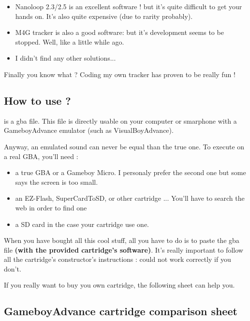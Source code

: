\begin{itemize}
    \item{Nanoloop 2.3/2.5 is an excellent software ! but it's quite difficult to get your hands on. It's also quite expensive (due to rarity probably).}
    \item{M4G tracker is also a good software: but it's development seems to be stopped. Well, like \FAT a little while ago.}
    \item{I didn't find any other solutions...}
\end{itemize}\medskip

Finally you know what ? Coding my own tracker has proven to be really fun !
\medskip

\subsection{How to use \FAT ?}

\FAT is a gba file. This file is directly usable on your computer or smarphone with a GameboyAdvance emulator (such as VisualBoyAdvance).
\medskip

Anyway, an emulated sound can never be equal than the true one.
To execute \FAT on a real GBA, you'll need :
\medskip

\begin{itemize}
    \item{a true GBA or a Gameboy Micro. I personaly prefer the second one but some says the screen is too small.}
    \item{an EZ-Flash, SuperCardToSD, or other cartridge ... You'll have to search the web in order to find one}
    \item{a SD card in the case your cartridge use one.}
\end{itemize}\medskip

When you have bought all this cool stuff, all you have to do is to paste the \FAT gba file {\bf (with the provided cartridge's software)}.
It's really important to follow all the cartridge's constructor's instructions : \FAT could not work correctly if you don't.


If you really want to buy you own cartridge, the following sheet can help you.

\subsection{GameboyAdvance cartridge comparison sheet}

